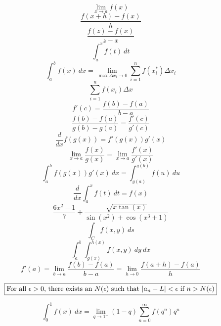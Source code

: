 \documentclass[12pt]{article}
\begin{document}

$$\boxed{\lim_{x\to a}f(x)}$$
$$\boxed{\frac{f(x+h) - f(x)}{h}}$$
$$\boxed{\frac{f(z) - f(x)}{z-x}}$$
$$\boxed{\int_a^x f(t) ~dt}$$
$$\boxed{\int_a^b f(x) ~dx = \lim_{\max \Delta x_i \to 0}\sum_{i=1}^n f(x_i^*)\Delta x_i}$$
$$\boxed{\sum_{i=1}^n f(x_i)\Delta x}$$
$$\boxed{f'(c) = \frac{f(b)-f(a)}{b-a}}$$
$$\boxed{\frac{f(b)-f(a)}{g(b)-g(a)} = \frac{f'(c)}{g'(c)}}$$
$$\boxed{\frac{d}{dx}f(g(x)) = f'(g(x))g'(x)}$$
$$\boxed{\lim_{x\to a}\frac{f(x)}{g(x)} = \lim_{x\to a}\frac{f'(x)}{g'(x)}}$$
$$\boxed{\int_a^b f(g(x))g'(x) ~dx = \int_{g(a)}^{g(b)} f(u) ~du}$$
$$\boxed{\frac{d}{dx} \int_a^x f(t) ~dt = f(x)}$$
$$\boxed{\frac{6x^2-1}{7} + \frac{\sqrt{x\tan(x)}}{\sin(x^2)+\cos(x^3+1)}}$$
$$\boxed{\int_C f(x,y) ~ds}$$
$$\boxed{\int_a^b \int_{g(x)}^{h(x)} f(x,y) ~dy ~dx}$$
$$\boxed{f'(a) = \lim_{b\to a}\frac{f(b)-f(a)}{b-a} = \lim_{h\to 0}\frac{f(a+h)-f(a)}{h}}$$

$$\boxed{\hbox{For all $\epsilon>0$, there exists an $N(\epsilon)$ such that $|a_n - L| < \epsilon$ if $n>N(\epsilon)$}}$$


$$\boxed{\int_0^1 f(x) ~dx = \lim_{q\to 1^-} (1-q)\sum_{n=0}^\infty f(q^n)q^n}$$
\end{document}
